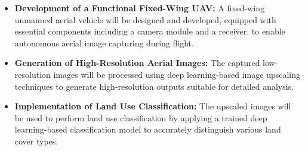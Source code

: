 \begin{itemize}
    \item \textbf{Development of a Functional Fixed-Wing UAV:} A fixed-wing unmanned aerial vehicle will be designed and developed, equipped with essential components including a camera module and a receiver, to enable autonomous aerial image capturing during flight.
    
    \item \textbf{Generation of High-Resolution Aerial Images:} The captured low-resolution images will be processed using deep learning-based image upscaling techniques to generate high-resolution outputs suitable for detailed analysis.
    
    \item \textbf{Implementation of Land Use Classification:} The upscaled images will be used to perform land use classification by applying a trained deep learning-based classification model to accurately distinguish various land cover types.
\end{itemize}
